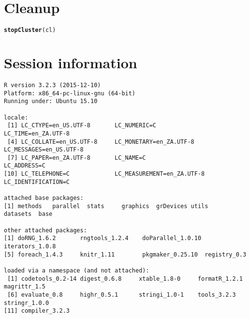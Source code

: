 \documentclass[a4paper,12pt]{article}\usepackage[]{graphicx}\usepackage[]{color}
\makeatletter
\newcommand{\hlstd}[1]{\textcolor[rgb]{0.345,0.345,0.345}{#1}}%
\newcommand{\hlkwd}[1]{\textcolor[rgb]{0.737,0.353,0.396}{\textbf{#1}}}%
\newenvironment{kframe}{%
 \def\at@end@of@kframe{}%
 \ifinner\ifhmode%
  \def\at@end@of@kframe{\end{minipage}}%
  \begin{minipage}{\columnwidth}%
 \fi\fi%
 \def\FrameCommand##1{\hskip\@totalleftmargin \hskip-\fboxsep
 \colorbox{shadecolor}{##1}\hskip-\fboxsep
     \hskip-\linewidth \hskip-\@totalleftmargin \hskip\columnwidth}%
 \MakeFramed {\advance\hsize-\width
   \@totalleftmargin\z@ \linewidth\hsize
   \@setminipage}}%
 {\par\unskip\endMakeFramed%
 \at@end@of@kframe}
\newenvironment{knitrout}{}{} %
\makeatother
\begin{document}
\section*{Cleanup}
\begin{knitrout}\footnotesize
{}\color{fgcolor}\begin{kframe}
\begin{alltt}
\hlkwd{stopCluster}\hlstd{(cl)}
\end{alltt}
\end{kframe}
\end{knitrout}

\section*{Session information}
\begin{knitrout}\footnotesize
{}\color{fgcolor}\begin{kframe}
\begin{verbatim}
R version 3.2.3 (2015-12-10)
Platform: x86_64-pc-linux-gnu (64-bit)
Running under: Ubuntu 15.10

locale:
 [1] LC_CTYPE=en_US.UTF-8       LC_NUMERIC=C               LC_TIME=en_ZA.UTF-8       
 [4] LC_COLLATE=en_US.UTF-8     LC_MONETARY=en_ZA.UTF-8    LC_MESSAGES=en_US.UTF-8   
 [7] LC_PAPER=en_ZA.UTF-8       LC_NAME=C                  LC_ADDRESS=C              
[10] LC_TELEPHONE=C             LC_MEASUREMENT=en_ZA.UTF-8 LC_IDENTIFICATION=C       

attached base packages:
[1] methods   parallel  stats     graphics  grDevices utils     datasets  base     

other attached packages:
[1] doRNG_1.6.2       rngtools_1.2.4    doParallel_1.0.10 iterators_1.0.8  
[5] foreach_1.4.3     knitr_1.11        pkgmaker_0.25.10  registry_0.3     

loaded via a namespace (and not attached):
 [1] codetools_0.2-14 digest_0.6.8     xtable_1.8-0     formatR_1.2.1    magrittr_1.5    
 [6] evaluate_0.8     highr_0.5.1      stringi_1.0-1    tools_3.2.3      stringr_1.0.0   
[11] compiler_3.2.3  
\end{verbatim}
\end{kframe}
\end{knitrout}

\printbibliography[heading=bibintoc]
\end{document}
